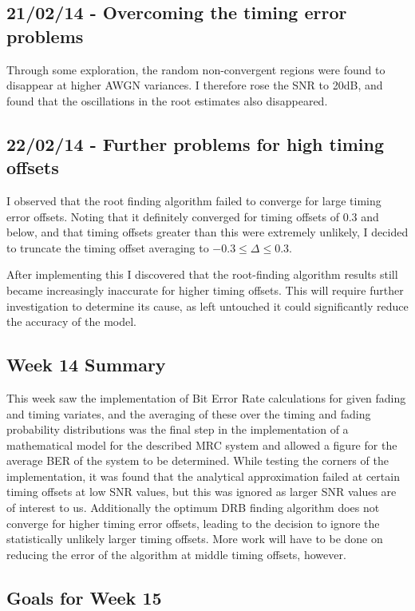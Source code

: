 \subsection{21/02/14 - Overcoming the timing error problems}

Through some exploration, the random non-convergent regions were found
to disappear at higher AWGN variances. I therefore rose the SNR to 20dB,
and found that the oscillations in the root estimates also disappeared.

\subsection{22/02/14 - Further problems for high timing offsets}

I observed that the root finding algorithm failed to converge for large
timing error offsets. Noting that it definitely converged for timing
offsets of 0.3 and below, and that timing offsets greater than this were
extremely unlikely, I decided to truncate the timing offset averaging to
$-0.3 \le \Delta \le 0.3$.

After implementing this I discovered that the root-finding algorithm
results still became increasingly inaccurate for higher timing offsets.
This will require further investigation to determine its cause, as left
untouched it could significantly reduce the accuracy of the model.

\subsection{Week 14 Summary}

This week saw the implementation of Bit Error Rate calculations for
given fading and timing variates, and the averaging of these over the
timing and fading probability distributions was the final step in the
implementation of a mathematical model for the described MRC system and
allowed a figure for the average BER of the system to be determined.
While testing the corners of the implementation, it was found that the
analytical approximation failed at certain timing offsets at low SNR
values, but this was ignored as larger SNR values are of interest to us.
Additionally the optimum DRB finding algorithm does not converge for
higher timing error offsets, leading to the decision to ignore the
statistically unlikely larger timing offsets. More work will have to be
done on reducing the error of the algorithm at middle timing offsets,
however.

\subsection{Goals for Week 15}

